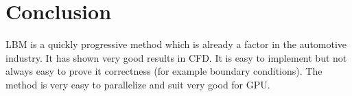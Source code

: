 
\section{Conclusion}

LBM is a quickly progressive method which is already a factor in the automotive industry. It has shown very good results in CFD. It is easy to implement but not always easy to prove it correctness (for example boundary conditions). The method is very easy to parallelize and suit very good for GPU.
